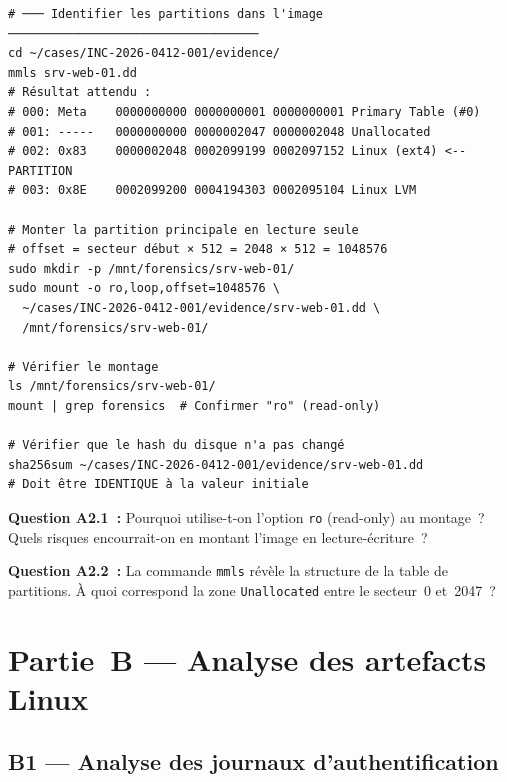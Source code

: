 \begin{lstlisting}[style=StyleTerminal,
  caption={Montage de l'image disque en lecture seule sur SIFT},
  label={lst:lab2-montage}]
# ─── Identifier les partitions dans l'image ───────────────────────────────────
cd ~/cases/INC-2026-0412-001/evidence/
mmls srv-web-01.dd
# Résultat attendu :
# 000: Meta    0000000000 0000000001 0000000001 Primary Table (#0)
# 001: -----   0000000000 0000002047 0000002048 Unallocated
# 002: 0x83    0000002048 0002099199 0002097152 Linux (ext4) <-- PARTITION
# 003: 0x8E    0002099200 0004194303 0002095104 Linux LVM

# Monter la partition principale en lecture seule
# offset = secteur début × 512 = 2048 × 512 = 1048576
sudo mkdir -p /mnt/forensics/srv-web-01/
sudo mount -o ro,loop,offset=1048576 \
  ~/cases/INC-2026-0412-001/evidence/srv-web-01.dd \
  /mnt/forensics/srv-web-01/

# Vérifier le montage
ls /mnt/forensics/srv-web-01/
mount | grep forensics  # Confirmer "ro" (read-only)

# Vérifier que le hash du disque n'a pas changé
sha256sum ~/cases/INC-2026-0412-001/evidence/srv-web-01.dd
# Doit être IDENTIQUE à la valeur initiale
\end{lstlisting}

\begin{boxexo}
\textbf{Question A2.1~:} Pourquoi utilise-t-on l'option \texttt{ro}
(read-only) au montage~? Quels risques encourrait-on en montant
l'image en lecture-écriture~?

\medskip\textbf{Question A2.2~:} La commande \texttt{mmls} révèle
la structure de la table de partitions. À quoi correspond la zone
\texttt{Unallocated} entre le secteur~0 et~2047~?
\end{boxexo}


\section{Partie~B — Analyse des artefacts Linux}
\label{lab2:partieB}

\subsection{B1 — Analyse des journaux d'authentification}

